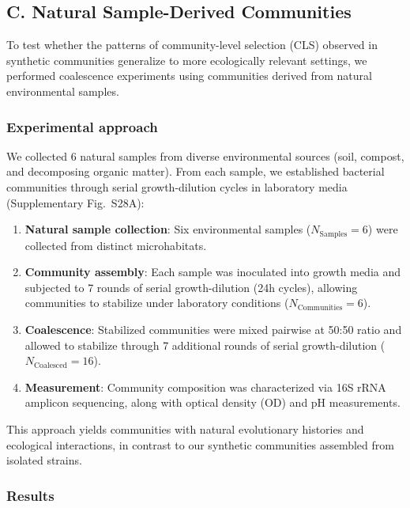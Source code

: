 \subsection*{C. Natural Sample-Derived Communities}
\label{sec:suppl:natural_communities}

To test whether the patterns of community-level selection (CLS) observed in synthetic communities generalize to more ecologically relevant settings, we performed coalescence experiments using communities derived from natural environmental samples.

\subsubsection*{Experimental approach}

We collected 6 natural samples from diverse environmental sources (soil, compost, and decomposing organic matter). From each sample, we established bacterial communities through serial growth-dilution cycles in laboratory media (Supplementary Fig.~S28A):

\begin{enumerate}
    \item \textbf{Natural sample collection}: Six environmental samples ($N_{\text{Samples}} = 6$) were collected from distinct microhabitats.
    \item \textbf{Community assembly}: Each sample was inoculated into growth media and subjected to 7 rounds of serial growth-dilution (24h cycles), allowing communities to stabilize under laboratory conditions ($N_{\text{Communities}} = 6$).
    \item \textbf{Coalescence}: Stabilized communities were mixed pairwise at 50:50 ratio and allowed to stabilize through 7 additional rounds of serial growth-dilution ($N_{\text{Coalesced}} = 16$).
    \item \textbf{Measurement}: Community composition was characterized via 16S rRNA amplicon sequencing, along with optical density (OD) and pH measurements.
\end{enumerate}

This approach yields communities with natural evolutionary histories and ecological interactions, in contrast to our synthetic communities assembled from isolated strains.

\subsubsection*{Results}

